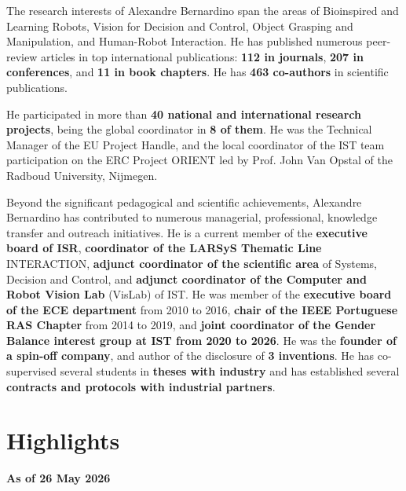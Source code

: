 \documentclass[
]{article}
\begin{document}
The research interests of Alexandre Bernardino span the areas of
Bioinspired and Learning Robots, Vision for Decision and Control, Object
Grasping and Manipulation, and Human-Robot Interaction. He has published
numerous peer-review articles in top international publications:
\textbf{112 in journals}, \textbf{207 in conferences}, and \textbf{11 in
book chapters}. He has \textbf{463 co-authors} in scientific
publications.

He participated in more than \textbf{40 national and international
research projects}, being the global coordinator in \textbf{8 of them}.
He was the Technical Manager of the EU Project Handle, and the local
coordinator of the IST team participation on the ERC Project ORIENT led
by Prof. John Van Opstal of the Radboud University, Nijmegen.

Beyond the significant pedagogical and scientific achievements,
Alexandre Bernardino has contributed to numerous managerial,
professional, knowledge transfer and outreach initiatives. He is a
current member of the \textbf{executive board of ISR},
\textbf{coordinator of the LARSyS Thematic Line} INTERACTION,
\textbf{adjunct coordinator of the scientific area} of Systems, Decision
and Control, and \textbf{adjunct coordinator of the Computer and Robot
Vision Lab} (VisLab) of IST. He was member of the \textbf{executive
board of the ECE department} from 2010 to 2016, \textbf{chair of the
IEEE Portuguese RAS Chapter} from 2014 to 2019, and \textbf{joint
coordinator of the Gender Balance interest group at IST from 2020 to
2026}. He was the \textbf{founder of a spin-off company}, and author of
the disclosure of \textbf{3 inventions}. He has co-supervised several
students in \textbf{theses with industry} and has established several
\textbf{contracts and protocols with industrial partners}.

\section*{Highlights}\label{highlights}

\textbf{As of 26 May 2026}
\end{document}
